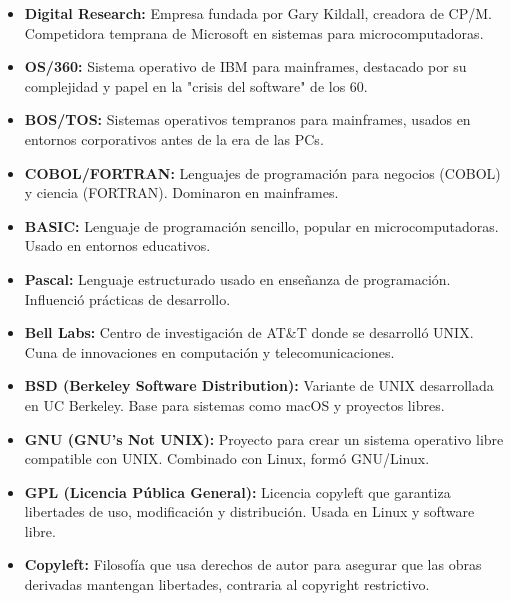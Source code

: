 \documentclass[a4paper,12pt]{article}
\begin{document}
\begin{itemize}
    \item \textbf{Digital Research:} Empresa fundada por Gary Kildall, creadora de CP/M. Competidora temprana de Microsoft en sistemas para microcomputadoras.
    \label{digitalresearch}

    \item \textbf{OS/360:} Sistema operativo de IBM para mainframes, destacado por su complejidad y papel en la "crisis del software" de los 60.
    \label{os360}

    \item \textbf{BOS/TOS:} Sistemas operativos tempranos para mainframes, usados en entornos corporativos antes de la era de las PCs.
    \label{bostos}

    \item \textbf{COBOL/FORTRAN:} Lenguajes de programación para negocios (COBOL) y ciencia (FORTRAN). Dominaron en mainframes.
    \label{cobolfortran}

    \item \textbf{BASIC:} Lenguaje de programación sencillo, popular en microcomputadoras. Usado en entornos educativos.
    \label{basic}

    \item \textbf{Pascal:} Lenguaje estructurado usado en enseñanza de programación. Influenció prácticas de desarrollo.
    \label{pascal}

    \item \textbf{Bell Labs:} Centro de investigación de AT\&T donde se desarrolló UNIX. Cuna de innovaciones en computación y telecomunicaciones.
    \label{belllabs}

    \item \textbf{BSD (Berkeley Software Distribution):} Variante de UNIX desarrollada en UC Berkeley. Base para sistemas como macOS y proyectos libres.
    \label{bsd}

    \item \textbf{GNU (GNU's Not UNIX):} Proyecto para crear un sistema operativo libre compatible con UNIX. Combinado con Linux, formó GNU/Linux.
    \label{gnu}

    \item \textbf{GPL (Licencia Pública General):} Licencia copyleft que garantiza libertades de uso, modificación y distribución. Usada en Linux y software libre.
    \label{gpl}

    \item \textbf{Copyleft:} Filosofía que usa derechos de autor para asegurar que las obras derivadas mantengan libertades, contraria al copyright restrictivo.
    \label{copyleft}


\end{itemize}
\end{document}
